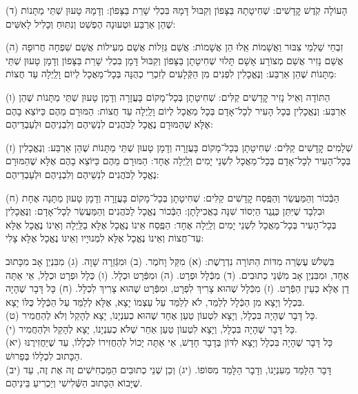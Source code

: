 \documentclass[twoside, openany, parskip=half, 11pt]{book}
\begin{document}
(ד) הָעוֹלָה קֹֽדֶשׁ קׇדָשִׁים: שְׁחִיטָתָהּ בַּצָּפוֹן וְקִבּוּל דָּמָהּ בִּכְלִי שָׁרֵת בַּצָּפוֹן: וְדָמָהּ טָעוּן שְׁתֵּי מַתָּנוֹת שֶׁהֵן אַרְבַּע וּטְעוּנָה הֶפְשֵׁט וְנִתּֽוּחַ וְכָלִיל לָאִשִּׁים: 

(ה) זִבְחֵי שַׁלְמֵי צִבּוּר וַאֲשָׁמוֹת אֵֽלוּ הֵן אֲשָׁמוֹת: אֲשַׁם גְּזֵלוֹת אֲשַׁם מְעִילוֹת אֲשַׁם שִׁפְחָה חֲרוּפָה אֲשַׁם נָזִיר אֲשַׁם מְצוֹרָע אָשָׁם תָּלוּי שְׁחִיטָתָן בַּצָּפוֹן וְקִבּוּל דָּמָן בִּכְלִי שָׁרֵת בַּצָּפוֹן וְדָמָן טָעוּן שְׁתֵּי מַתָּנוֹת שֶׁהֵן אַרְבַּע: וְנֶאֱכָלִין לִפְנִים מִן הַקְּֿלָעִים לְזִכְרֵי כְהֻנָּה בְּכָל־מַאֲכָל לְיוֹם וָלַֽיְלָה עַד חֲצוֹת: 

(ו) הַתּוֹדָה וְאֵיל נָזִיר קׇדָשִׁים קַלִּים: שְׁחִיטָתָן בְּכָל־מָקוֹם בָּעֲזָרָה וְדָמָן טָעוּן שְׁתֵּי מַתָּנוֹת שֶׁהֵן אַרְבַּע: וְנֶאֱכָלִין בְּכָל הָעִיר לְכָל־אָדָם בְּכָל מַאֲכָל לְיוֹם וָלַֽיְלָה עַד חֲצוֹת: הַמּוּרָם מֵהֶם כַּיּוֹצֵא בָהֶם אֶלָּא שֶׁהַמּוּרָם נֶאֱכָל לַכֹּהֲנִים לִנְשֵׁיהֶם וְלִבְנֵיהֶם וּלְעַבְדֵיהֶם: 

(ז) שְׁלָמִים קׇדָשִׁים קַלִּים: שְׁחִיטָתָן בְּכָל־מָקוֹם בָּעֲזָרָה וְדָמָן טָעוּן שְׁתֵּי מַתָּנוֹת שֶׁהֵן אַרְבַּע: וְנֶאֱכָלִין בְּכָל־הָעִיר לְכָל־אָדָם בְּכָל־מַאֲכָל לִשְׁנֵי יָמִים וְלַֽיְלָה אֶחָד: הַמּוּרָם מֵהֶם כַּיּוֹצֵא בָהֶם אֶלָּא שֶׁהַמּוּרָם נֶאֱכָל לַכֹּהֲנִים לִנְשֵׁיהֶם וְלִבְנֵיהֶם וּלְעַבְדֵיהֶם: 

(ח) הַבְּֿכוֹר וְהַמַּעֲשֵׂר וְהַפֶּֽסַח קׇדָשִׁים קַלִּים: שְׁחִיטָתָן בְּכָל־מָקוֹם בָּעֲזָרָה וְדָמָן טָעוּן מַתָּנָה אֶחָת וּבִלְבָד שֶׁיִּתֵּן כְּנֶֽגֶד הַיְסוֹד שִׁנָּה בַאֲכִילָתָן: הַבְּֿכוֹר נֶאֱכָל לַכֹּהֲנִים וְהַמַּעֲשֵׂר לְכָל־אָדָם: וְנֶּאֱכָלִין בְּכָל־הָעִיר בְּכָל־מַאֲכָל לִשְׁנֵי יָמִים וְלַֽיְלָה אֶחָד: הַפֶּֽסַח אֵינוֹ נֶאֱכָל אֶלָּא בַלַּֽיְלָה וְאֵינוֹ נֶאֱכָל אֶלָּא עַד־חֲצוֹת וְאֵינוֹ נֶאֱכָל אֶלָּא לִמְנוּיָיו וְאֵינוֹ נֶאֱכָל אֶלָּא צָלִי:

\nextpage


בִּשְׁלֹשׁ עֶשְׂרֵה מִדּוֹת הַתּוֹרָה נִדְרֶשֶׁת:\hfill \break
(א) מִקַּל וָחֹמֶר.\hfill \break
(ב) וּמִגְּֿזֵרָה שָׁוָה.\hfill \break
(ג) מִבִּנְיַן אָב מִכָּתוּב אֶחָד, וּמִבִּנְיַן אָב מִשְּֿׁנֵי כְתוּבִים.\hfill \break
(ד) מִכְּֿלָל וּפְרָט.\hfill \break
(ה) וּמִפְּֿרָט וּכְלָל.\hfill \break
(ו) כְּלָל וּפְרָט וּכְלָל, אֵי אַתָּה דָן אֶלָּא כְּעֵין הַפְּֿרָט.\hfill \break
(ז) מִכְּֿלָל שֶׁהוּא צָרִיךְ לִפְרָט, וּמִפְּֿרָט שֶׁהוּא צָרִיךְ לִכְלָל.\hfill \break
(ח) כָּל דָּבָר שֶׁהָיָה בִּכְלָל וְיָצָא מִן הַכְּֿלָל לְלַמֵּד, לֹא לְלַמֵּד עַל עַצְמוֹ יָצָא, אֶלָּא לְלַמֵּד עַל הַכְּֿלָל כֻּלּוֹ יָצָא. \\
(ט) כָּל דָּבָר שֶׁהָיָה בִּכְלָל, וְיָצָא לִטְעוֹן טַעַן אֶחָד שֶׁהוּא כְעִנְיָנוֹ, יָצָא לְהָקֵל וְלֹא לְהַחֲמִיר. \\
(י) כָּל דָּבָר שֶׁהָיָה בִּכְלָל, וְיָצָא לִטְעוֹן טַעַן אַחֵר שֶׁלֹּא כְעִנְיָנוֹ, יָצָא לְהָקֵל וּלְהַחֲמִיר. \\
(יא) כָּל דָּבָר שֶׁהָיָה בִּכְלָל וְיָצָא לִדּוֹן בְּדָבָר חָדָשׁ, אֵי אַתָּה יָכוֹל לְהַחֲזִירוֹ לִכְלָלוֹ, עַד שֶׁיַּחֲזִירֶנּוּ הַכָּתוּב לִכְלָלוֹ בְּפֵרוּשׁ. \\
(יב) דָּבָר הַלָּמֵד מֵעִנְיָנוֹ, וְדָבָר הַלָּמֵד מִסּוֹפוֹ.\hfill \break
(יג) וְכֵן שְׁנֵי כְתוּבִים הַמַּכְחִישִׁים זֶה אֶת זֶה, עַד שֶׁיָּבוֹא הַכָּתוּב הַשְּֿׁלִישִׁי וְיַכְרִיעַ בֵּינֵיהֶם. 
\end{document}
